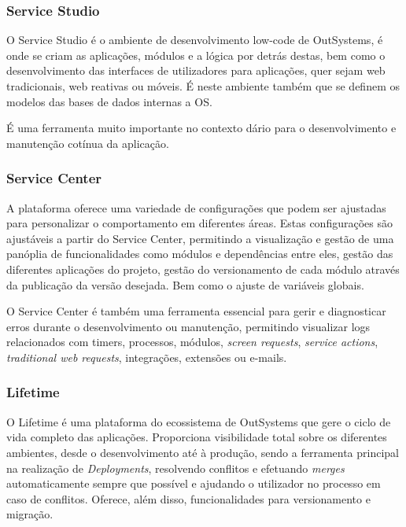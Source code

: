 \subsubsection{Service Studio}

    O Service Studio é o ambiente de desenvolvimento low-code de OutSystems, é onde se criam as aplicações, módulos e a lógica por detrás destas, bem como o desenvolvimento das interfaces de utilizadores para aplicações, quer sejam web tradicionais, web reativas ou móveis. 
    É neste ambiente também que se definem os modelos das bases de dados internas a OS. 
    
    É uma ferramenta muito importante no contexto dário para o desenvolvimento e manutenção cotínua da aplicação.

\subsubsection{Service Center}

    A plataforma oferece uma variedade de configurações que podem ser ajustadas para personalizar o comportamento em diferentes áreas. Estas configurações são ajustáveis a partir do Service Center, permitindo a visualização e gestão de uma panóplia de funcionalidades como módulos e dependências entre eles, gestão das diferentes aplicações do projeto, gestão do versionamento de cada módulo através da publicação da versão desejada. Bem como o ajuste de variáveis globais.
    
    O Service Center é também uma ferramenta essencial para gerir e diagnosticar erros durante o desenvolvimento ou manutenção, permitindo visualizar logs relacionados com timers, processos, módulos, \textit{screen requests}, \textit{service actions}, \textit{traditional web requests}, integrações, extensões ou e-mails.

\subsubsection{Lifetime}

    O Lifetime é uma plataforma do ecossistema de OutSystems que gere o ciclo de vida completo das aplicações. Proporciona visibilidade total sobre os diferentes ambientes, desde o desenvolvimento até à produção, sendo a ferramenta principal na realização de \textit{Deployments}, resolvendo conflitos e efetuando \textit{merges} automaticamente sempre que possível e ajudando o utilizador no processo em caso de conflitos. Oferece, além disso, funcionalidades para versionamento e migração.
